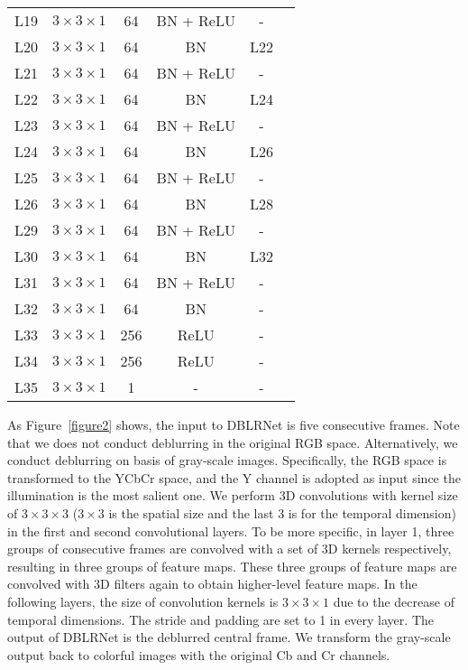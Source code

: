 \documentclass[journal]{IEEEtran}
\begin{document}
\begin{table}
\begin{tabular}{cccccc}
     L19    & $3 \times 3 \times 1$  & 64 & BN + ReLU & - \\
     L20    & $3 \times 3 \times 1$  & 64 & BN        & L22 \\ 
     L21    & $3 \times 3 \times 1$  & 64 & BN + ReLU & - \\
     L22    & $3 \times 3 \times 1$  & 64 & BN        & L24 \\ 
     L23    & $3 \times 3 \times 1$  & 64 & BN + ReLU & - \\
     L24    & $3 \times 3 \times 1$  & 64 & BN        & L26 \\   
     L25    & $3 \times 3 \times 1$  & 64 & BN + ReLU & - \\
     L26    & $3 \times 3 \times 1$  & 64 & BN        & L28 \\ 
     L29    & $3 \times 3 \times 1$  & 64 & BN + ReLU & - \\
     L30    & $3 \times 3 \times 1$  & 64 & BN        & L32 \\ 
     \midrule
     L31    & $3 \times 3 \times 1$  & 64 & BN + ReLU & - \\
     L32    & $3 \times 3 \times 1$  & 64 & BN        & - \\
 	\midrule
     L33    & $3 \times 3 \times 1$  & 256&     ReLU & - \\
     L34    & $3 \times 3 \times 1$  & 256&     ReLU & - \\
     L35    & $3 \times 3 \times 1$  & 1  &    -     & - \\
    \bottomrule
    \end{tabular}
  \label{table1}
\end{table}

As Figure~\ref{figure2} shows, the input to DBLRNet is five consecutive frames. Note that we does not conduct deblurring in the original RGB space. Alternatively, we conduct deblurring on basis of gray-scale images. Specifically, the RGB space is transformed to the YCbCr space, and the Y channel is adopted as input since the illumination is the most salient one. We perform 3D convolutions with kernel size of $3 \times 3 \times 3$ ($3 \times 3$ is the spatial size and the last 3 is for the temporal dimension) in the first and second convolutional layers. To be more specific, in layer 1, three groups of consecutive frames are convolved with a set of 3D kernels respectively, resulting in three groups of feature maps. These three groups of feature maps are convolved with 3D filters again to obtain higher-level feature maps. In the following layers, the size of convolution kernels is $3 \times 3 \times 1$ due to the decrease of temporal dimensions. The stride and padding are set to 1 in every layer. The output of DBLRNet is the deblurred central frame. We transform the gray-scale output back to colorful images with the original Cb and Cr channels. 
\end{document}

